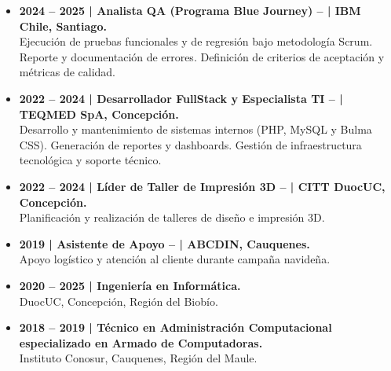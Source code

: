 \documentclass[9pt]{developercv}
\begin{document}
\begin{itemize}
  \item \textbf{2024 -- 2025 | Analista QA (Programa Blue Journey) – | IBM Chile, Santiago.}
  \\Ejecución de pruebas funcionales y de regresión bajo metodología Scrum. Reporte y documentación de errores. Definición de criterios de aceptación y métricas de calidad.

  \item \textbf{2022 -- 2024 | Desarrollador FullStack y Especialista TI – | TEQMED SpA, Concepción.}
  \\Desarrollo y mantenimiento de sistemas internos (PHP, MySQL y Bulma CSS). Generación de reportes y dashboards. Gestión de infraestructura tecnológica y soporte técnico.

  \item \textbf{2022 -- 2024 | Líder de Taller de Impresión 3D – | CITT DuocUC, Concepción.}
  \\Planificación y realización de talleres de diseño e impresión 3D.

  \item \textbf{2019 | Asistente de Apoyo – | ABCDIN, Cauquenes.}
  \\Apoyo logístico y atención al cliente durante campaña navideña.
\end{itemize}

\begin{itemize}
  \item \textbf{2020 -- 2025 | Ingeniería en Informática.}
  \\DuocUC, Concepción, Región del Biobío.

  \item \textbf{2018 -- 2019 | Técnico en Administración Computacional especializado en Armado de Computadoras. }
  \\Instituto Conosur, Cauquenes, Región del Maule.
\end{itemize}
\end{document}
